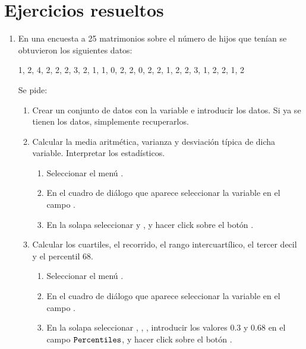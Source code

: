 \section{Ejercicios resueltos}
\begin{enumerate}[leftmargin=*]
\item En una encuesta a 25 matrimonios sobre el número de hijos que tenían se obtuvieron los siguientes datos:
\begin{center}
1, 2, 4, 2, 2, 2, 3, 2, 1, 1, 0, 2, 2, 0, 2, 2, 1, 2, 2, 3, 1, 2, 2, 1, 2
\end{center}
Se pide:
\begin{enumerate}
\item Crear un conjunto de datos con la variable  e introducir los datos. 
Si ya se tienen los datos, simplemente recuperarlos.

\item Calcular la media aritmética, varianza y desviación típica de dicha variable.
Interpretar los estadísticos. 
\begin{indicacion}{
\begin{enumerate}
\item Seleccionar el menú .
\item En el cuadro de diálogo que aparece seleccionar la variable  en el campo .
\item En la solapa  seleccionar  y , y hacer
click sobre el botón .
\end{enumerate}}
\end{indicacion}

\item Calcular los cuartiles, el recorrido, el rango intercuartílico, el tercer decil y el percentil 68. 
\begin{indicacion}{
\begin{enumerate}
\item Seleccionar el menú .
\item En el cuadro de diálogo que aparece seleccionar la variable  en el campo .
\item En la solapa  seleccionar , , , introducir los valores $0.3$ y $0.68$ en el campo $\texttt{Percentiles}$, y hacer click sobre el botón
.
\end{enumerate}}
\end{indicacion}
\end{enumerate}


\end{enumerate}
